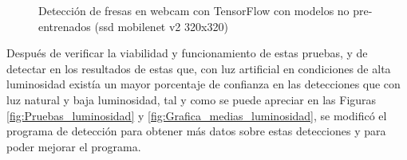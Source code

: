 \begin{figure}[H]
    \hspace{1mm}
    \hspace{1mm}
    
    \caption{Detección de fresas en webcam con TensorFlow con modelos no pre-entrenados (ssd mobilenet v2 320x320)}
    \label{fig:deteccion_Fresas_webcam_TF_ssdmobilenet}
\end{figure}

Después de verificar la viabilidad y funcionamiento de estas pruebas, y de detectar en los resultados de estas que, con luz artificial en condiciones de alta luminosidad existía un mayor porcentaje de confianza en las detecciones que con luz natural y baja luminosidad, tal y como se puede apreciar en las Figuras \ref{fig:Pruebas_luminosidad} y \ref{fig:Grafica_medias_luminosidad}, se modificó el programa de detección para obtener más datos sobre estas detecciones y para poder mejorar el programa.

